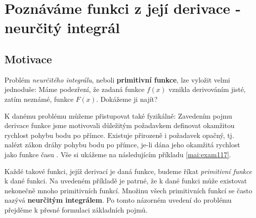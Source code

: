 \setchaptertoc
\chapter{Poznáváme funkci z její derivace - neurčitý integrál}\label{mai:IchapVII}
  \section{Motivace}
    Problém \emph{neurčitého integrálu}, neboli \textbf{primitivní funkce}, lze vyložit velmi 
    jednoduše: Máme podezření, že zadaná funkce \(f(x)\) vznikla derivováním jisté, zatím neznámé, 
    funkce \(F(x)\). Dokážeme ji najít? 
  
    K danému problému můžeme přistupovat také fyzikálně: Zavedením pojmu derivace funkce jsme 
    motivovali důležitým požadavkem definovat okamžitou rychlost pohybu bodu po přímce. Existuje 
    přirozeně i požadavek opačný, tj. nalézt zákon dráhy pohybu bodu po přímce, je-li dána jeho 
    okamžitá rychlost jako funkce času \cite[s.~253]{Brabec1989}. Vše si ukážeme na následujícím 
    příkladu \eqref{mai:exam117}.      

    Každé takové funkci, jejíž derivací je daná funkce, budeme říkat \emph{primitivní funkce} k 
    dané funkci. Na uvedeném příkladě je patrné, že k dané funkci může existovat nekonečně mnoho 
    primitivních funkcí. Množinu všech primitivních funkcí se často nazývá \textbf{neurčitým 
    integrálem}. Po tomto názorném uvedení do problému přejděme k přesné formulaci základních pojmů.
    
    

